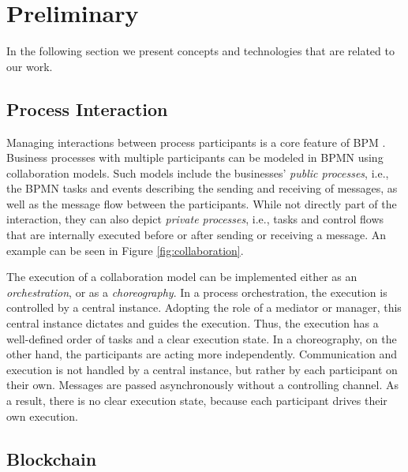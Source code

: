 \documentclass[runningheads]{llncs}
\begin{document}
\section{Preliminary} \label{preliminary}

In the following section we present concepts and technologies that are related to our work.

\subsection{Process Interaction}

Managing interactions between process participants is a core feature of BPM
\cite{Weske2012}. %
Business processes with multiple participants can be modeled in BPMN using collaboration models.
Such models include the businesses' \emph{public processes}, i.e., the BPMN tasks and events describing the sending and receiving of messages, as well as the message flow between the participants.
While not directly part of the interaction, they can also depict \emph{private processes}, i.e., tasks and control flows that are internally executed before or after sending or receiving a message.
An example can be seen in Figure \ref{fig:collaboration}.

The execution of a collaboration model can be implemented either as an \emph{orchestration}, or as a \emph{choreography}.
In a process orchestration, the execution is controlled by a central instance.
Adopting the role of a mediator or manager, this central instance dictates and guides the execution.
Thus, the execution has a well-defined order of tasks and a clear execution state.
In a choreography, on the other hand, the participants are acting more independently.
Communication and execution is not handled by a central instance, but rather by each participant on their own.
Messages are passed asynchronously without a controlling channel.
As a result, there is no clear execution state, because each participant drives their own execution.

\subsection{Blockchain}
\end{document}
